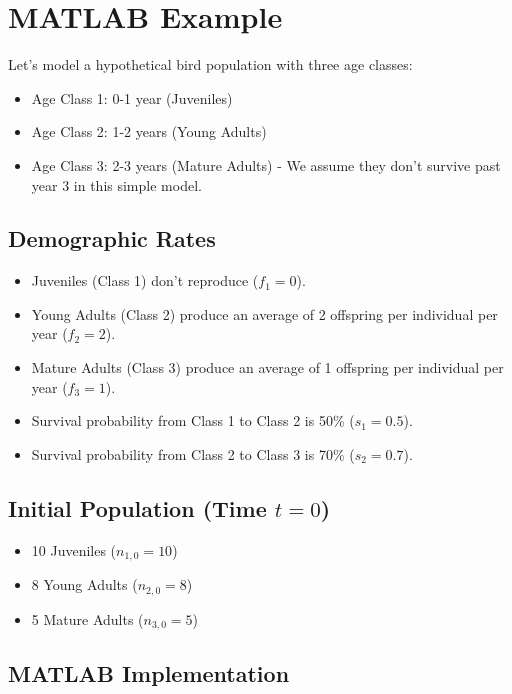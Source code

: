 \documentclass{article}
\begin{document}
\section{MATLAB Example}

Let's model a hypothetical bird population with three age classes:
\begin{itemize}
    \item Age Class 1: 0-1 year (Juveniles)
    \item Age Class 2: 1-2 years (Young Adults)
    \item Age Class 3: 2-3 years (Mature Adults) - We assume they don't survive past year 3 in this simple model.
\end{itemize}

\subsection{Demographic Rates}
\begin{itemize}
    \item Juveniles (Class 1) don't reproduce ($f_1 = 0$).
    \item Young Adults (Class 2) produce an average of 2 offspring per individual per year ($f_2 = 2$).
    \item Mature Adults (Class 3) produce an average of 1 offspring per individual per year ($f_3 = 1$).
    \item Survival probability from Class 1 to Class 2 is 50\% ($s_1 = 0.5$).
    \item Survival probability from Class 2 to Class 3 is 70\% ($s_2 = 0.7$).
\end{itemize}

\subsection{Initial Population (Time $t=0$)}
\begin{itemize}
    \item 10 Juveniles ($n_{1,0} = 10$)
    \item 8 Young Adults ($n_{2,0} = 8$)
    \item 5 Mature Adults ($n_{3,0} = 5$)
\end{itemize}




\subsection{MATLAB Implementation}
\end{document}
